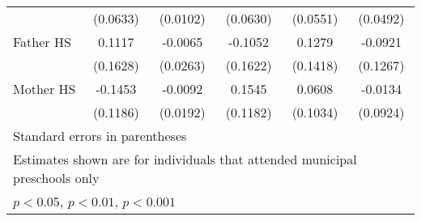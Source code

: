 \begin{table}[htbp]
\begin{tabular}{l*{5}{c}}
            &    (0.0633)         &    (0.0102)         &    (0.0630)         &    (0.0551)         &    (0.0492)         \\
\addlinespace
Father HS   &      0.1117         &     -0.0065         &     -0.1052         &      0.1279         &     -0.0921         \\
            &    (0.1628)         &    (0.0263)         &    (0.1622)         &    (0.1418)         &    (0.1267)         \\
\addlinespace
Mother HS   &     -0.1453         &     -0.0092         &      0.1545         &      0.0608         &     -0.0134         \\
            &    (0.1186)         &    (0.0192)         &    (0.1182)         &    (0.1034)         &    (0.0924)         \\
\bottomrule
\multicolumn{6}{l}{\footnotesize Standard errors in parentheses}\\
\multicolumn{6}{l}{\footnotesize Estimates shown are for individuals that attended municipal preschools only}\\
\multicolumn{6}{l}{\footnotesize \sym{*} \(p<0.05\), \sym{**} \(p<0.01\), \sym{***} \(p<0.001\)}\\
\end{tabular}
\end{table}
